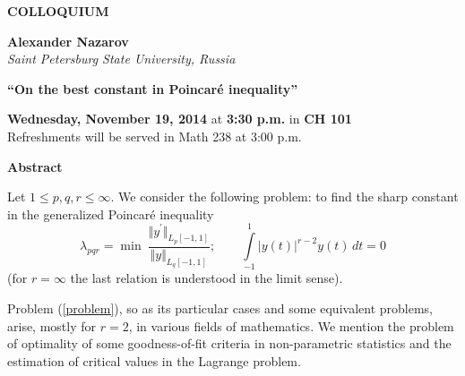 \documentclass[oneside,letter]{article}
\newcommand{\talktitle}{\textbf{``On the best constant in Poincar\'e inequality''}}
\newcommand{\talkspeaker}{ \textbf{\sc Alexander Nazarov} \\ \textit{Saint Petersburg State University, Russia}}
\newcommand{\talkabstract}{
Let $1\le p, q, r \le \infty$. We consider the following problem: to find the sharp
constant in the generalized Poincar\'e inequality
\begin{equation}\label{problem}
\lambda_{pqr}=\min\ \frac{\Vert y^{\prime}\Vert_{L_p\left[-1,1\right] }}
{\Vert y\Vert _{L_q\left[-1,1\right] }};\qquad \int\limits_{-1}^1 |y(t)|^{r-2}y(t)\, dt=0
\end{equation}
(for $r=\infty$ the last relation is understood in the limit sense).%

Problem (\ref{problem}), so as its particular cases and some equivalent problems,
arise, mostly for $r=2$, in various fields of mathematics.
We mention the problem of optimality of some goodness-of-fit criteria
in non-parametric statistics %
 and the estimation of critical values
in the Lagrange problem. 
}
\begin{document}

 \vspace*{1.2cm}
\begin{center}

\vspace{0.2cm}
{{\fontsize{45}{60} \textbf{COLLOQUIUM} }}
\vspace{0.2cm}




{\Huge \talkspeaker\\}

\vspace{0.7cm}
{\Huge \talktitle\\}
\vspace{0.7cm}

{\Large \textbf{Wednesday, November 19, 2014} at \textbf{3:30 p.m.} in \textbf{CH 101} \\
Refreshments will be served in Math 238 at 3:00 p.m. }

\vspace{0.8cm}

\end{center}



\begin{center}


\begin{center}
{\LARGE \textbf{Abstract}}

\begin{minipage}[c]{.96\linewidth}
{
\vspace*{.25cm}

{\large \talkabstract}
\vspace*{.25cm}
}
\end{minipage}



\end{center}

\end{center}
\end{document}
